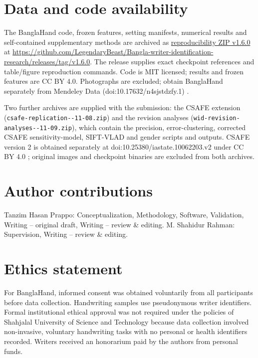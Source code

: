 \section*{Data and code availability}
The BanglaHand code, frozen features, setting manifests, numerical results and self-contained supplementary methods are archived as \href{https://github.com/LegendaryBeast/Bangla-writer-identification-research/releases/download/v1.6.0/wid-reproducibility-v1.6.0.zip}{reproducibility ZIP v1.6.0} at \url{https://github.com/LegendaryBeast/Bangla-writer-identification-research/releases/tag/v1.6.0}. The release supplies exact checkpoint references and table/figure reproduction commands. Code is MIT licensed; results and frozen features are CC BY 4.0. Photographs are excluded; obtain BanglaHand separately from Mendeley Data (doi:10.17632/n4sjstdzfy.1) \cite{banglahand2026data}.

Two further archives are supplied with the submission: the CSAFE extension (\texttt{csafe-replication--11-08.zip}) and the revision analyses (\texttt{wid-revision-\allowbreak analyses--11-09.zip}), which contain the precision, error-clustering, corrected CSAFE sensitivity-model, SIFT-VLAD and gender scripts and outputs. CSAFE version 2 is obtained separately at doi:10.25380/iastate.10062203.v2 under CC BY 4.0 \cite{crawford2026csafe}; original images and checkpoint binaries are excluded from both archives.

\section*{Author contributions}
Tanzim Hasan Prappo: Conceptualization, Methodology, Software, Validation, Writing -- original draft, Writing -- review \& editing. M. Shahidur Rahman: Supervision, Writing -- review \& editing.

\section*{Ethics statement}
For BanglaHand, informed consent was obtained voluntarily from all participants before data collection. Handwriting samples use pseudonymous writer identifiers. Formal institutional ethical approval was not required under the policies of Shahjalal University of Science and Technology because data collection involved non-invasive, voluntary handwriting tasks with no personal or health identifiers recorded. Writers received an honorarium paid by the authors from personal funds.

